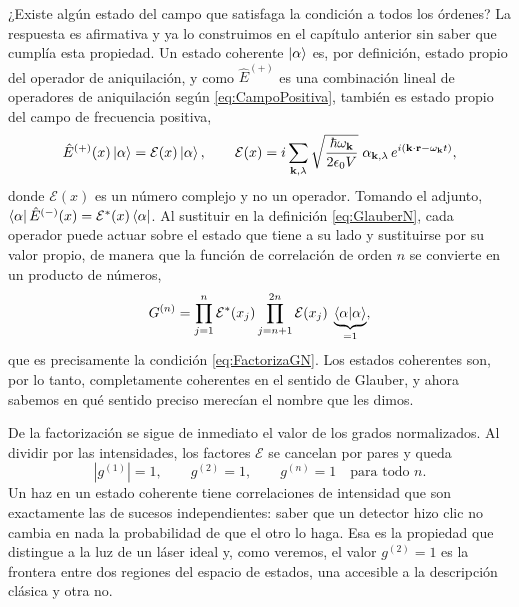     ¿Existe algún estado del campo que satisfaga la condición a todos los órdenes? La respuesta es afirmativa y ya lo construimos en el capítulo anterior sin saber que cumplía esta propiedad. Un estado coherente $\ket{\alpha}$ es, por definición, estado propio del operador de aniquilación, y como $\hat{E}^{(+)}$ es una combinación lineal de operadores de aniquilación según \eqref{eq:CampoPositiva}, también es estado propio del campo de frecuencia positiva,
    \begin{equation}\label{eq:PropioCampo}
        \hat{E}^{(+)}(x)\ket{\alpha} = \mathcal{E}(x)\ket{\alpha},
        \qquad
        \mathcal{E}(x) = i\sum_{\mathbf{k},\lambda}\sqrt{\frac{\hbar\omega_{\mathbf{k}}}{2\epsilon_{0}V}}\;\alpha_{\mathbf{k},\lambda}\,e^{i(\mathbf{k}\cdot\mathbf{r}-\omega_{\mathbf{k}}t)},
    \end{equation}
    donde $\mathcal{E}(x)$ es un número complejo y no un operador. Tomando el adjunto, $\bra{\alpha}\hat{E}^{(-)}(x) = \mathcal{E}^{*}(x)\bra{\alpha}$. Al sustituir en la definición \eqref{eq:GlauberN}, cada operador puede actuar sobre el estado que tiene a su lado y sustituirse por su valor propio, de manera que la función de correlación de orden $n$ se convierte en un producto de números,
    \begin{equation}\label{eq:FactorizacionCoherente}
        G^{(n)} = \prod_{j=1}^{n}\mathcal{E}^{*}(x_{j})\prod_{j=n+1}^{2n}\mathcal{E}(x_{j})\;\underbrace{\braket{\alpha|\alpha}}_{=1},
    \end{equation}
    que es precisamente la condición \eqref{eq:FactorizaGN}. Los estados coherentes son, por lo tanto, completamente coherentes en el sentido de Glauber, y ahora sabemos en qué sentido preciso merecían el nombre que les dimos.

    De la factorización se sigue de inmediato el valor de los grados normalizados. Al dividir por las intensidades, los factores $\mathcal{E}$ se cancelan por pares y queda
    \begin{equation}\label{eq:gnCoherente}
        \left|g^{(1)}\right| = 1,
        \qquad
        g^{(2)} = 1,
        \qquad
        g^{(n)} = 1 \quad\text{para todo } n .
    \end{equation}
    Un haz en un estado coherente tiene correlaciones de intensidad que son exactamente las de sucesos independientes: saber que un detector hizo clic no cambia en nada la probabilidad de que el otro lo haga. Esa es la propiedad que distingue a la luz de un láser ideal y, como veremos, el valor $g^{(2)}=1$ es la frontera entre dos regiones del espacio de estados, una accesible a la descripción clásica y otra no.

